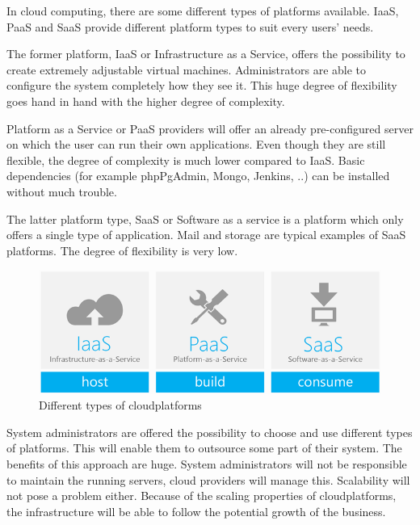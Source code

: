 \documentclass[journal]{IEEEtran}
\begin{document}
In cloud computing, there are some different types of platforms available.
IaaS, PaaS and SaaS provide different platform types to suit every users' needs.\newline

The former platform, IaaS or Infrastructure as a Service, offers the possibility to create extremely adjustable virtual machines.
Administrators are able to configure the system completely how they see it.
This huge degree of flexibility goes hand in hand with the higher degree of complexity.\newline

Platform as a Service or PaaS providers will offer an already pre-configured server on which the user can run their own applications.
Even though they are still flexible, the degree of complexity is much lower compared to IaaS.
Basic dependencies (for example phpPgAdmin, Mongo, Jenkins, ..) can be installed without much trouble.

The latter platform type, SaaS or Software as a service is a platform which only offers a single type of application.
Mail and storage are typical examples of SaaS platforms.
The degree of flexibility is very low.

\begin{figure}[]
    \centering
    \includegraphics[width=\linewidth]{images/image2.png}
    \caption{Different types of cloudplatforms\cite{cloud_stack}}
    \label{fig:cloudplatforms}
\end{figure}

System administrators are offered the possibility to choose and use different types of platforms.
This will enable them to outsource some part of their system.
The benefits of this approach are huge.
System administrators will not be responsible to maintain the running servers, cloud providers will manage this.
Scalability will not pose a problem either.
Because of the scaling properties of cloudplatforms, the infrastructure will be able to follow the potential growth of the business.\newline
\end{document}
